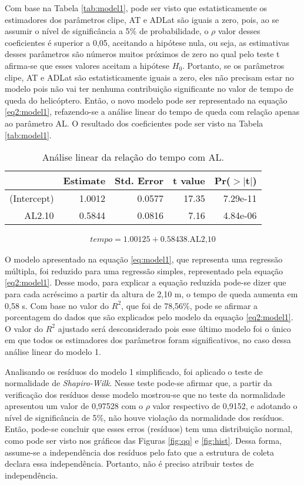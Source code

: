 Com base na Tabela \ref{tab:model1}, pode ser visto que estatisticamente os estimadores dos parâmetros clipe, AT e ADLat são iguais a zero, pois, ao se assumir o nível de significância a 5\% de probabilidade, o $\rho$ valor desses coeficientes é superior a 0,05, aceitando a hipótese nula, ou seja, as estimativas desses parâmetros são números muitos próximos de zero no qual pelo teste t afirma-se que esses valores aceitam a hipótese $H_0$. Portanto, se os parâmetros clipe, AT e ADLat são estatisticamente iguais a zero, eles não precisam estar no modelo pois não vai ter nenhuma contribuição significante no valor de tempo de queda do helicóptero. Então, o novo modelo pode ser representado na equação \ref{eq2:model1}, refazendo-se a análise linear do tempo de queda com relação apenas ao parâmetro AL. O resultado dos coeficientes pode ser visto na Tabela \ref{tab:model1}. 

\begin{table}[ht]
    \centering
    \caption{Análise linear da relação do tempo com AL.}
    \begin{tabular}{rrrrr}
      \hline
     & Estimate & Std. Error & t value & Pr($>$$|$t$|$) \\ 
      \hline
    (Intercept) & 1.0012 & 0.0577 & 17.35 & 7.29e-11 \\ 
      AL2.10 & 0.5844 & 0.0816 & 7.16 & 4.84e-06 \\ 
       \hline
    \end{tabular}
    \label{tab2:model1}
\end{table}

\begin{align}
    tempo = 1.00125 + 0.58438\text{.AL2,10}
    \label{eq2:model1}
\end{align}

O modelo apresentado na equação \ref{eq:model1}, que representa uma regressão múltipla, foi reduzido para uma regressão simples, representado pela equação \ref{eq2:model1}. Desse modo, para explicar a equação reduzida pode-se dizer que para cada acréscimo a partir da altura de 2,10 m, o tempo de queda aumenta em 0,58 s. Com base no valor do $R^2$, que foi de 78,56\%, pode se afirmar a porcentagem do dados que são explicados pelo modelo da equação \ref{eq2:model1}. O valor do $R^2$ ajustado será desconsiderado pois esse último modelo foi o único em que todos os estimadores dos parâmetros foram significativos, no caso dessa análise linear do modelo 1. 

Analisando os resíduos do modelo 1 simplificado, foi aplicado o teste de normalidade de \textit{Shapiro-Wilk}. Nesse teste pode-se afirmar que, a partir da verificação dos resíduos desse modelo mostrou-se que no teste da normalidade apresentou um valor de 0,97528 com o $\rho$ valor respectivo de 0,9152, e adotando o nível de significância de 5\%, não houve violação da normalidade dos resíduos. Então, pode-se concluir que esses erros (resíduos) tem uma distribuição normal, como pode ser visto nos gráficos das Figuras \ref{fig:qq} e \ref{fig:hist}. Dessa forma, assume-se a independência dos resíduos pelo fato que a estrutura de coleta declara essa independência. Portanto, não é preciso atribuir testes de independência.

